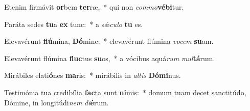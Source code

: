 \item Etenim firmávit \textbf{or}bem \textbf{ter}ræ,~* qui non \textit{com}\textit{mo}\textbf{vé}\textbf{bi}tur.
\item Paráta sedes \textbf{tu}a \textbf{ex} tunc:~* a sǽ\textit{cu}\textit{lo} \textbf{tu} es.
\item Elevavérunt \textbf{flú}mina, \textbf{Dó}mine:~* elevavérunt flúmina \textit{vo}\textit{cem} \textbf{su}am.
\item Elevavérunt flúmina \textbf{fluc}tus \textbf{su}os,~* a vócibus aquá\textit{rum} \textit{mul}\textbf{tá}rum.
\item Mirábiles elati\textbf{ó}nes \textbf{ma}ris:~* mirábilis in \textit{al}\textit{tis} \textbf{Dó}\textbf{mi}nus.
\item Testimónia tua credibília \textbf{fac}ta sunt \textbf{ni}mis:~* domum tuam decet sanctitúdo, Dómine, in longitúdi\textit{nem} \textit{di}\textbf{é}rum.
